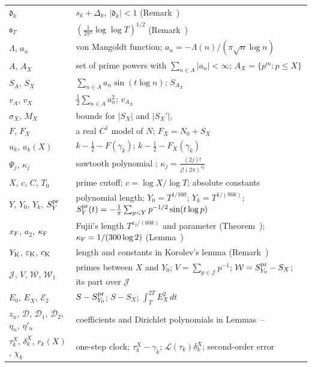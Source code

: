 \documentclass[preprint,12pt]{elsarticle}
\makeatletter
\let\CG@origref\ref
\let\CG@origeqref\eqref
\newcommand{\CG@gettip}[1]{\@ifundefined{CGTip@#1}{Reference: #1}{\csname CGTip@#1\endcsname}}
\DeclareRobustCommand{\CGref}[1]{\pdftooltip{\CG@origref{#1}}{\CG@gettip{#1}}}
\DeclareRobustCommand{\CGeqref}[1]{\pdftooltip{\CG@origeqref{#1}}{\CG@gettip{#1}}}
\numberwithin{equation}{section}
\theoremstyle{plain}
\theoremstyle{definition}
\theoremstyle{remark}
\newcommand{\NO}{N_0}
\newcommand{\lL}{\mathcal L}
\makeatother
\begin{document}
\begin{center}
\begin{longtable}{p{}p{}}
$\mathfrak d_k$ & $s_k+\Delta_k$, $|\mathfrak d_k|<1$ (Remark~\CGref{rem:korolev})\\
$\mathfrak s_T$ & $(\frac1{2\pi^2}\log\log T)^{1/2}$ (Remark~\CGref{rem:korolev})\\
$\Lambda$, $a_n$ & von Mangoldt function; $a_n=-\Lambda(n)/(\pi\sqrt n\log n)$\\
$A$, $A_X$ & set of prime powers with $\sum_{n\in A}|a_n|<\infty$; $A_X=\{p^m:p\le X\}$\\
$S_A$, $S_X$ & $\sum_{n\in A}a_n\sin(t\log n)$; $S_{A_X}$\\
$v_A$, $v_X$ & $\frac12\sum_{n\in A}a_n^2$; $v_{A_X}$\\
$\sigma_X$, $M_X$ & bounds for $|S_X|$ and $|S_X'|$, \CGeqref{eq:sigma_M_def}\\
$F$, $F_X$ & a real $C^1$ model of $N$; $F_X=\NO+S_X$\\
$u_k$, $u_k(X)$ & $k-\frac12-F(\gamma_k)$; $k-\frac12-F_X(\gamma_k)$\\
$\Psi_j$, $\kappa_j$ & sawtooth polynomial \CGeqref{eq:Psi_def}; $\kappa_j=\frac{(2j)!}{j!(2\pi)^{2j}}$\\
$X$, $c$, $C$, $T_0$ & prime cutoff; $c=\log X/\log T$; absolute constants\\
$Y$, $Y_0$, $Y_k$, $S^{\rm pr}_Y$ & polynomial length; $Y_0=T^{1/160}$; $Y_k=T^{1/(80k)}$; $S^{\rm pr}_Y(t)=-\frac1\pi\sum_{p<Y}p^{-1/2}\sin(t\log p)$\\
$x_{\rm F}$, $a_2$, $\kappa_{\rm F}$ & Fujii's length $T^{a_2/(60k)}$ and parameter (Theorem~\CGref{thm:known_fujii_selberg}); $\kappa_{\rm F}=1/(300\log2)$ (Lemma~\CGref{lem:selberg_uniform})\\
$Y_{\rm K}$, $\varepsilon_{\rm K}$, $c_{\rm K}$ & length and constants in Korolev's lemma (Remark~\CGref{rem:korolev_uniform})\\
$\mathcal J$, $V$, $\mathcal W$, $\mathcal W_1$ & primes between $X$ and $Y_0$; $V=\sum_{p\in\mathcal J}p^{-1}$; $\mathcal W=S^{\rm pr}_{Y_0}-S_X$; its part over $\mathcal J$ \CGeqref{eq:D_def}\\
$E_0$, $E_X$, $\mathcal E_2$ & $S-S^{\rm pr}_{Y_0}$; $S-S_X$; $\int_T^{2T}E_X^2\,dt$\\
$z_n$, $\mathcal D$, $\mathcal D_1$, $\mathcal D_2$, $\eta_n$, $\eta'_n$ & coefficients and Dirichlet polynomials in Lemmas~\CGref{lem:trig_MV}--\CGref{lem:D_moments}\\
$\tau_k^X$, $\delta_k^X$, $r_k(X)$, $\chi_k$ & one-step clock; $\tau_k^X-\gamma_k$; $\lL(\tau_k)\delta_k^X$; second-order error \CGeqref{eq:one_step_decomposition}\\

\end{longtable}
\end{center}
\end{document}
